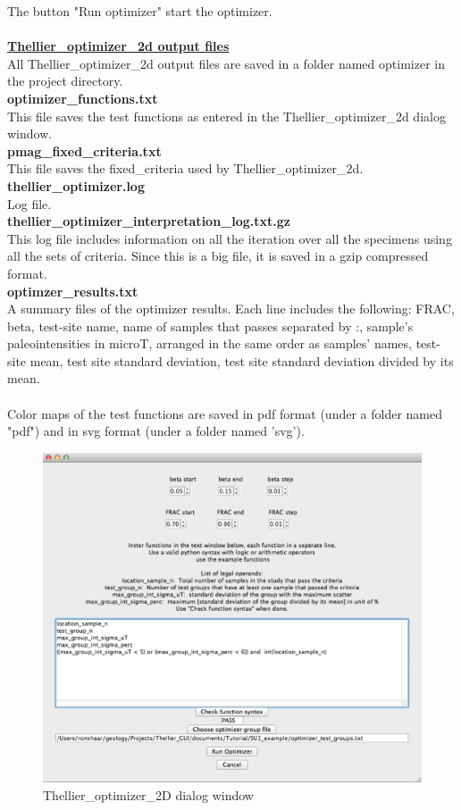 \documentclass[12pt]{article}
\begin{document}
The button "Run optimizer" start the optimizer.\\
\\
 \underline{ \textbf{  Thellier\_optimizer\_2d output files }}\\
All Thellier\_optimizer\_2d output files are saved in a folder named optimizer in the project directory.\\
{\bf optimizer\_functions.txt}\\
 This file saves the test functions as entered in the Thellier\_optimizer\_2d  dialog window.\\
{\bf pmag\_fixed\_criteria.txt}\\
 This file saves the fixed\_criteria used by Thellier\_optimizer\_2d.\\
{\bf thellier\_optimizer.log}\\
Log file. \\
{\bf thellier\_optimizer\_interpretation\_log.txt.gz}\\
This log file includes information on all the iteration over all the specimens using all the sets of criteria. Since this is a big file, it is saved in a gzip compressed format.\\
 {\bf optimzer\_results.txt}\\
A summary files of the optimizer results. Each line includes the following: FRAC, beta, test-site name, name of samples that passes separated by :, sample's paleointensities in microT, arranged in the same order as samples' names, test-site mean, test site standard deviation, test site standard deviation divided by its mean.\\
\\
Color maps of the test functions are saved in pdf format (under a folder named "pdf") and in svg format (under a folder named 'svg').

\begin{figure}[h!]
	\includegraphics[width=1.0\textwidth]{EPSFiles/Screenshot_optimizer_dialog.eps}
	 \caption{Thellier\_optimizer\_2D dialog window}
\end{figure}
\end{document}
